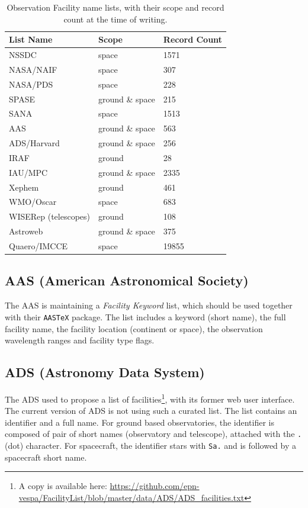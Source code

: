 \documentclass[11pt,a4paper]{ivoa}
\begin{document}
\begin{table}
\caption{Observation Facility name lists, with their scope and record 
count at the time of writing.}\label{tab:lists}
\begin{tabular}{lll}
List Name               & Scope           & Record Count \\
\hline
NSSDC                   &           space & 1571 \\
NASA/NAIF               &           space & 307 \\
NASA/PDS                &           space & 228 \\
SPASE                   & ground \& space & 215 \\
SANA                    &           space & 1513 \\
AAS                     & ground \& space & 563 \\
ADS/Harvard             & ground \& space & 256 \\
IRAF                    & ground          & 28 \\
IAU/MPC                 & ground \& space & 2335 \\
Xephem                  & ground          & 461 \\
WMO/Oscar               &           space & 683 \\
WISERep (telescopes)    & ground          & 108 \\
Astroweb                & ground \& space & 375 \\
Quaero/IMCCE            &           space & 19855
\end{tabular}
\end{table}


\subsection{AAS (American Astronomical Society)}
The AAS is maintaining a \emph{Facility Keyword} list, which should be used
together with their \texttt{AASTeX} package. The list includes a keyword 
(short name), the full facility name, the facility location (continent or 
space), the observation wavelength ranges and facility type flags.  

\subsection{ADS (Astronomy Data System)}
The ADS used to propose a list of facilities\footnote{A copy is available here: 
\protect\url{https://github.com/epn-vespa/FacilityList/blob/master/data/ADS/ADS_facilities.txt}}, 
with its former web user interface. The current version of ADS is not using 
such a curated list. The list contains an identifier and a full name. For 
ground based observatories, the identifier is composed of pair of 
short names (observatory and telescope), attached with the \texttt{.} (dot) 
character. For spacecraft, the identifier stars with \texttt{Sa.} and is 
followed by a spacecraft short name.
\end{document}
